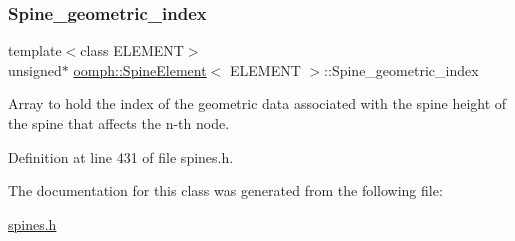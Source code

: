 \subsubsection{\texorpdfstring{Spine\+\_\+geometric\+\_\+index}{Spine\_geometric\_index}}
{\footnotesize\ttfamily template$<$class E\+L\+E\+M\+E\+NT$>$ \\
unsigned$\ast$ \hyperlink{classoomph_1_1SpineElement}{oomph\+::\+Spine\+Element}$<$ E\+L\+E\+M\+E\+NT $>$\+::Spine\+\_\+geometric\+\_\+index\hspace{0.3cm}{\ttfamily [private]}}



Array to hold the index of the geometric data associated with the spine height of the spine that affects the n-\/th node. 



Definition at line 431 of file spines.\+h.



The documentation for this class was generated from the following file\+:\begin{DoxyCompactItemize}
\item 
\hyperlink{spines_8h}{spines.\+h}\end{DoxyCompactItemize}
